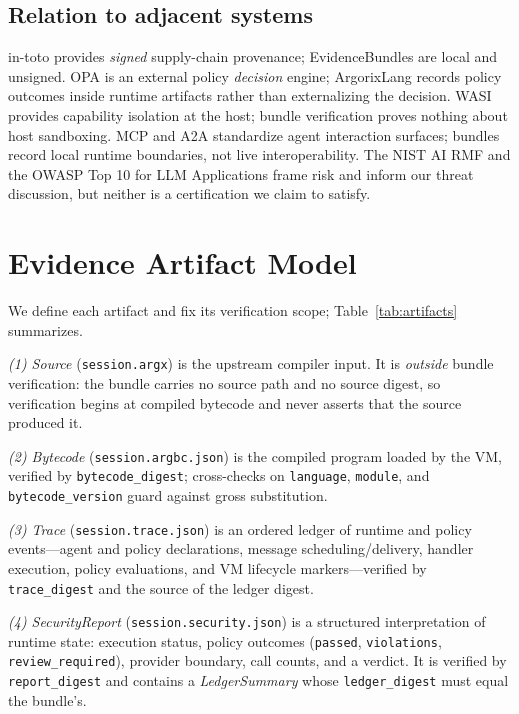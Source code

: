 \documentclass[conference]{IEEEtran}
\newcommand{\code}[1]{\texttt{\small #1}}
\newcommand{\Argorix}{%
\textcolor{argViolet}{A}\textcolor{argViolet}{r}\textcolor{argIndigo}{g}\textcolor{argIndigo}{o}\textcolor{argElectric}{r}\textcolor{argElectric}{i}\textcolor{argElectric}{x}\textcolor{argCyan}{L}\textcolor{argCyan}{a}\textcolor{argCyanBright}{n}\textcolor{argCyanBright}{g}\xspace}
\begin{document}
\subsection{Relation to adjacent systems}
in-toto \cite{torresarias2019intoto} provides \emph{signed} supply-chain provenance;
EvidenceBundles are local and unsigned. OPA \cite{opa_docs} is an external policy
\emph{decision} engine; \Argorix records policy outcomes inside runtime artifacts rather
than externalizing the decision. WASI \cite{wasi_intro} provides capability isolation at
the host; bundle verification proves nothing about host sandboxing. MCP and A2A
\cite{mcp_spec_2025,a2a_spec} standardize agent interaction surfaces; bundles record
local runtime boundaries, not live interoperability. The NIST AI RMF
\cite{tabassi2023airmf} and the OWASP Top 10 for LLM Applications
\cite{owasp_llm_top10} frame risk and inform our threat discussion, but neither is a
certification we claim to satisfy.

\section{Evidence Artifact Model}\label{sec:model}
We define each artifact and fix its verification scope; Table~\ref{tab:artifacts}
summarizes.

\emph{(1) Source} (\code{session.argx}) is the upstream compiler input. It is
\emph{outside} bundle verification: the bundle carries no source path and no source
digest, so verification begins at compiled bytecode and never asserts that the source
produced it.

\emph{(2) Bytecode} (\code{session.argbc.json}) is the compiled program loaded by the VM,
verified by \code{bytecode\_digest}; cross-checks on \code{language}, \code{module}, and
\code{bytecode\_version} guard against gross substitution.

\emph{(3) Trace} (\code{session.trace.json}) is an ordered ledger of runtime and policy
events---agent and policy declarations, message scheduling/delivery, handler execution,
policy evaluations, and VM lifecycle markers---verified by \code{trace\_digest} and the
source of the ledger digest.

\emph{(4) SecurityReport} (\code{session.security.json}) is a structured interpretation
of runtime state: execution status, policy outcomes (\code{passed}, \code{violations},
\code{review\_required}), provider boundary, call counts, and a verdict. It is verified
by \code{report\_digest} and contains a \emph{LedgerSummary} whose \code{ledger\_digest}
must equal the bundle's.
\end{document}
